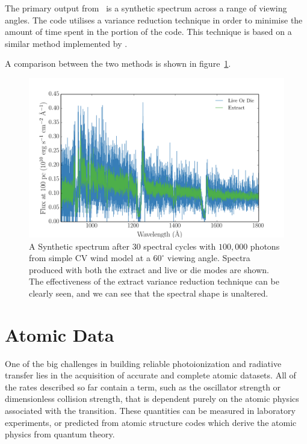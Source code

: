 The primary output from \py\ is a synthetic spectrum 
across a range of viewing angles. 
The code utilises a variance reduction technique in order to minimise the amount of 
time spent in the portion of the code. This technique is based 
on a similar method implemented by \citep{woods1991}.






A comparison between the two methods is shown in figure~\ref{fig:extract_demo}.

\begin{figure}
\centering
\includegraphics[width=1.0\textwidth]{figures/04-radtrans/extract_demo.png}
\caption
{
A Synthetic spectrum after $30$ spectral cycles with $100,000$ photons
from simple CV wind model at a $60^\circ$ viewing angle.
Spectra produced with both the extract and live or die modes
are shown. The effectiveness of the extract variance reduction technique can
be clearly seen, and we can see that the spectral shape is unaltered.
} 
\label{fig:extract_demo}
\end{figure}




\section{Atomic Data}

One of the big challenges in building reliable photoionization and radiative
transfer lies in the acquisition of accurate and complete atomic datasets.
All of the rates described so far contain a term, such as the oscillator strength 
or dimensionless collision strength, that is dependent purely on the atomic physics
associated with the transition. These quantities can be measured in laboratory experiments,
or predicted from atomic structure codes which derive the atomic physics from 
quantum theory.

